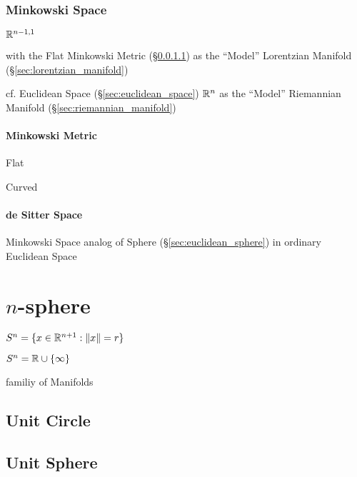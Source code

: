 \subsubsection{Minkowski Space}\label{sec:minkowski_space}

$\mathbb{R}^{n-1,1}$

with the Flat Minkowski Metric (\S\ref{sec:minkowski_metric}) as the
``Model'' Lorentzian Manifold (\S\ref{sec:lorentzian_manifold})

cf. Euclidean Space (\S\ref{sec:euclidean_space}) $\mathbb{R}^n$ as the
``Model'' Riemannian Manifold (\S\ref{sec:riemannian_manifold})



\paragraph{Minkowski Metric}\label{sec:minkowski_metric}\hfill

Flat

Curved



\paragraph{de Sitter Space}\label{sec:desitter_space}\hfill

Minkowski Space analog of Sphere (\S\ref{sec:euclidean_sphere}) in ordinary
Euclidean Space



\section{$n$-sphere}\label{sec:n_sphere}

$S^n = \{ x \in \mathbb{R}^{n+1} : \|x\| = r \}$

$S^n = \mathbb{R} \cup \{\infty\}$

familiy of Manifolds



\subsection{Unit Circle}\label{sec:unit_circle}

\subsection{Unit Sphere}\label{sec:unit_sphere}

